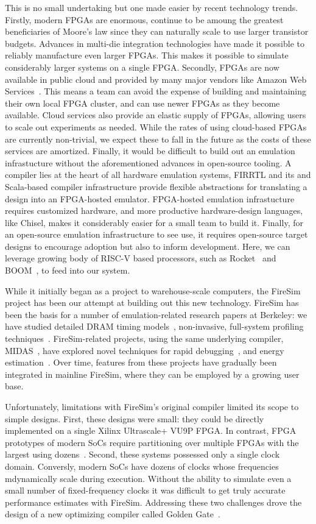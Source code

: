 This is no small undertaking but one made easier by recent technology trends.
Firstly, modern FPGAs are enormous, continue to be amoung the greatest
beneficiaries of Moore's law since they can naturally scale to use larger
transistor budgets. Advances in multi-die integration technologies have made
it possible to reliably manufacture even larger FPGAs. This makes it possible to
simulate considerably larger systems on a single FPGA.  Secondly, FPGAs are now available
in public cloud and provided by many major vendors like Amazon Web Services~\cite{amazonf1}.
This means a team can avoid the expense of building and
maintaining their own local FPGA cluster, and can use newer FPGAs as they
become available. Cloud services also provide an elastic supply of FPGAs,
allowing users to scale out experiments as needed. While the rates of using
cloud-based FPGAs are currently non-trivial, we expect these to fall in the
future as the costs of these services are amortized. Finally, it would be
difficult to build out an emulation infrastucture without the aforementioned advances in
open-source tooling. A compiler lies at the heart of all hardware emulation systems,
FIRRTL and its and Scala-based compiler infrastructure provide flexible
abstractions for translating a design into an FPGA-hosted emulator. FPGA-hosted emulation
infrastucture requires customized hardware, and more productive hardware-design
languages, like Chisel, makes it considerably easier for a small team to build
it. Finally, for an open-source emulation infrastructure to see use, it
requires open-source target designs to encourage adoption but also to inform
development. Here, we can leverage growing body of RISC-V based processors,
such as Rocket~\cite{RocketChip} and BOOM~\cite{BOOM}, to feed into our system.

While it initially began as a project to warehouse-scale computers, the
FireSim~\cite{FireSim} project has been our attempt at building out this
new technology. FireSim has been the basis for a
number of emulation-related research papers at Berkeley: we have studied
detailed DRAM timing models~\cite{FASED}, non-invasive, full-system profiling
techniques~\cite{FirePerf}.  FireSim-related projects, using the same
underlying compiler, MIDAS~\cite{MIDAS}, have explored novel techniques for rapid
debugging~\cite{DESSERT}, and energy estimation~\cite{Simmani, Strober}. Over
time, features from these projects have gradually been integrated in mainline
FireSim, where they can be employed by a growing user base.

Unfortunately, limitations with FireSim's original compiler limited its scope
to simple designs. First, these designs were small: they could be directly
implemented on a single Xilinx Ultrascale+ VU9P FPGA. In contrast, FPGA prototypes
of modern SoCs require partitioning over multiple FPGAs with the largest using
dozens~\cite{FPMM}.  Second, these systems possessed only a single
clock domain. Conversly, modern SoCs have dozens of clocks whose frequencies
mdynamically scale during execution. Without the ability to simulate
even a small number of fixed-frequency clocks it was difficult to get truly
accurate performance estimates with FireSim. Addressing these two challenges
drove the design of a new optimizing compiler called Golden Gate~\cite{GoldenGate}.

